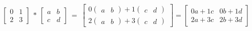 \documentclass[12 pt]{slides}
\begin{document}
\begingroup
\[\begin{bmatrix}0 & 1\\2 & 3\end{bmatrix}\ *\ \begin{bmatrix}a & b\\c & d\end{bmatrix}\ =
\ \begin{bmatrix}0\begin{pmatrix}a & b\end{pmatrix} + 1\begin{pmatrix}c & d\end{pmatrix} \\
                 2\begin{pmatrix}a & b\end{pmatrix} + 3\begin{pmatrix}c & d\end{pmatrix}\end{bmatrix} 
= \begin{bmatrix}0a + 1c & 0b + 1d\\2a + 3c & 2b + 3d\end{bmatrix}\]
\endgroup
\end{document}
